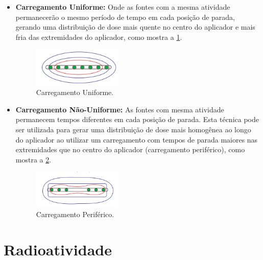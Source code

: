 \documentclass[11pt,a4paper]{article}
\begin{document}
			\begin{itemize}
				\item \textbf{Carregamento Uniforme: } Onde as fontes com a mesma atividade permanecerão o mesmo período de tempo em cada posição de parada, gerando uma distribuição de dose mais quente no centro do aplicador e mais fria das extremidades do aplicador, como mostra a    \ref{img:carregamentoUniforme}.
				
					\begin{figure}[h]
						\centering
						\includegraphics[width=0.4\textwidth]{Imagens/carregamentoUniforme.jpg}
						\caption{Carregamento Uniforme.}
						\label{img:carregamentoUniforme}
					\end{figure}

				\item \textbf{Carregamento Não-Uniforme:} As fontes com mesma atividade permanecem tempos diferentes em cada posição de parada. Esta técnica pode ser utilizada para gerar uma distribuição de dose mais homogênea ao longo do aplicador ao utilizar um carregamento com tempos de parada maiores nas extremidades que no centro do aplicador (carregamento periférico), como mostra a    \ref{img:carregamentoPeriferico}.
				
				\begin{figure}[h]
					\centering
					\includegraphics[width=0.4\textwidth]{Imagens/carregamentoPeriferico.jpg}
					\caption{Carregamento Periférico.}
					\label{img:carregamentoPeriferico}
				\end{figure}

			\end{itemize}
		
	\section{Radioatividade}
\end{document}
